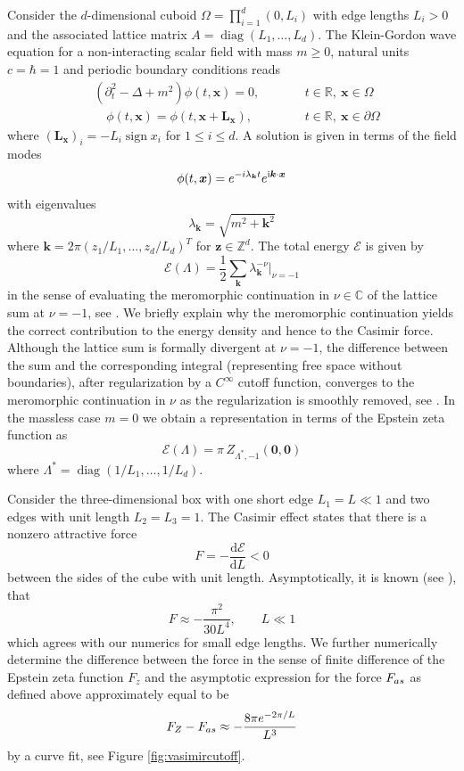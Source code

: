 \documentclass[]{amsart}
\DeclareMathOperator{\sgn}{sign}
\DeclareMathOperator{\diag}{diag}
\newcommand{\new}[1]{#1}
\newcommand{\zeps}[3]{\new{Z_{#1} (#2, #3)}}
\numberwithin{mythm}{section}
\begin{document}
\new{Consider the \(d\)-dimensional cuboid \(\Omega=\prod_{i=1}^d (0,L_i)\) with edge lengths $L_i>0$ and the associated
 lattice matrix \(A=\diag(L_1,\ldots,L_d)\).}
The Klein-Gordon wave equation
for a non-interacting scalar field with mass \(m\ge 0\), natural units $c=\hbar=1$
and periodic boundary conditions reads
\[
\begin{aligned}
&(\partial_t^2-\Delta+m^2)\phi(t,\bm x)=0, &&\qquad t\in\mathds R,\ \bm x\in \new{\Omega}\\ 
&\quad\phi(t,\bm x)=\phi(t,\bm x +\bm L_{\bm x}), &&\qquad t\in\mathds R,\ \bm x\in\partial \new{\Omega}
\end{aligned}
\]
where 
\((\bm L_{\bm x})_i=-L_i\sgn x_i\)
for \(1\le i\le d\).
A solution is given in terms of the field modes 
\[
\phi(t,\bm x)=e^{-i\lambda_{\bm k}t}
e^{\text i \bm k \cdot \bm x}
\]
with eigenvalues
\[
\lambda_{\bm k}=\sqrt{m^2+\bm k^2}
\]
where \(\bm k
=2\pi(z_1/L_1,\ldots,z_d/L_d)^T\) for \(\bm z\in\mathds Z^d\).
The total energy \(\mathcal E\) is given by 
\[
\mathcal E(\Lambda)=
\frac 12\sum_{\bm k}\lambda_{\bm k}^{-\nu}\Big|_{\nu=-1}
\]
in the sense of evaluating the meromorphic continuation in \(\nu\in\mathds C\) of the lattice sum at \(\nu = -1\), see \cite{liAttractiveRepulsiveNature1997,ederyMultidimensionalCutoffTechnique2005,ambjornPropertiesVacuumMechanical1983}. \new{We briefly explain why the meromorphic continuation yields the correct contribution to the energy density and hence to the Casimir force. Although the lattice sum is formally divergent at $\nu=-1$, the difference between the sum and the corresponding integral (representing free space without boundaries), after regularization by a $C^\infty$ cutoff function, converges to the meromorphic continuation in $\nu$ as the regularization is smoothly removed, see \cite[Thm.~5.6]{buchheit2022singular}.}
In the massless case \(m=0\) we obtain a representation in terms of the Epstein zeta function as
\[\mathcal E(\Lambda)=\pi\,\zeps{\Lambda^{\ast},-1}{\bm 0}{\bm 0}\]
where $\Lambda^*=\diag(1/L_1,\ldots,1/L_d)$.

Consider the three-dimensional box with one short edge 
\(L_1=L\ll 1\) and two edges with unit length $L_2=L_3=1$.
The Casimir effect states that there is a nonzero attractive force
\[F=-\frac{\mathrm{d}\mathcal E}{\mathrm{d} L}<0\]
between the sides of the cube with unit length.
Asymptotically, it is known
(see \cite{zeidlerQuantumFieldTheory2006}), that
\[
F\approx -\frac{\pi^2}{30 L^4}
,\qquad
L\ll 1
\]
which agrees with our numerics for small edge lengths.
We further numerically determine the difference between the force in the sense of finite difference of the Epstein zeta function $F_z$ and the asymptotic expression for the force $F_{\rm as}$ as defined above approximately equal to be
\[
F_Z-F_{\rm as}\approx -\frac{8 \pi e^{-2\pi /L}}{L^3}
\]
by a curve fit, see 
Figure \ref{fig:vasimircutoff}.
\end{document}
